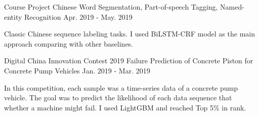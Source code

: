 \begin{cventries}
  \cventry
    {Course Project} %
    {Chinese Word Segmentation, Part-of-speech Tagging, Named-entity Recognition} %
    {} %
    {Apr. 2019 - May. 2019} %
    {
      \begin{cvitems} %
        \item {Classic Chinese sequence labeling tasks. I used BiLSTM-CRF model as the main approach comparing with other baselines.}
      \end{cvitems}
    }

  \cventry
    {Digital China Innovation Contest 2019} %
    {Failure Prediction of Concrete Piston for Concrete Pump Vehicles} %
    {} %
    {Jan. 2019 - Mar. 2019} %
    {
      \begin{cvitems} %
        \item {In this competition, each sample was a time-series data of a concrete pump vehicle. The goal was to predict the likelihood of each data sequence that whether a machine might fail. I used LightGBM and reached Top 5\% in rank.}
      \end{cvitems}
    }

\end{cventries}
